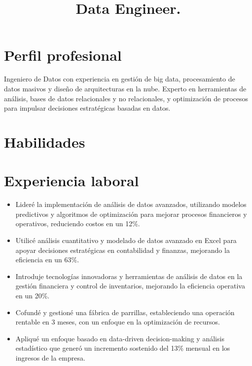 \documentclass[11pt,a4paper]{moderncv}
\title{Data Engineer.} %
\begin{document}
\makecvtitle

\section{Perfil profesional}
Ingeniero de Datos con experiencia en gestión de big data, procesamiento de datos masivos y diseño de arquitecturas en la nube. Experto en herramientas de análisis, bases de datos relacionales y no relacionales, y optimización de procesos para impulsar decisiones estratégicas basadas en datos.
\section{Habilidades}

\section{Experiencia laboral}
%
{
  \begin{itemize} %
    \item Lideré la implementación de análisis de datos avanzados, utilizando modelos predictivos y algoritmos de optimización para mejorar procesos financieros y operativos, reduciendo costos en un 12\%.
    \item Utilicé análisis cuantitativo y modelado de datos avanzado en Excel para apoyar decisiones estratégicas en contabilidad y finanzas, mejorando la eficiencia en un 63\%.
    \item Introduje tecnologías innovadoras y herramientas de análisis de datos en la gestión financiera y control de inventarios, mejorando la eficiencia operativa en un 20\%.
    \item Cofundé y gestioné una fábrica de parrillas, estableciendo una operación rentable en 3 meses, con un enfoque en la optimización de recursos.
    \item Apliqué un enfoque basado en data-driven decision-making y análisis estadístico que generó un incremento sostenido del 13\% mensual en los ingresos de la empresa.
  \end{itemize}
}
\end{document}
